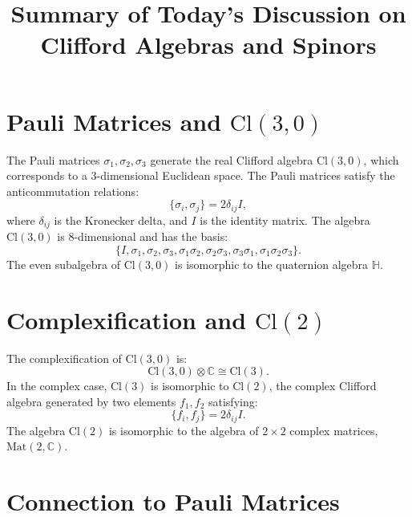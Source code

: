 \documentclass{article}
\begin{document}
\title{Summary of Today's Discussion on Clifford Algebras and Spinors}
\author{}
\date{}
\maketitle

\section*{Pauli Matrices and $\text{Cl}(3, 0)$}

The Pauli matrices $\sigma_1, \sigma_2, \sigma_3$ generate the real Clifford
algebra $\text{Cl}(3, 0)$, which corresponds to a 3-dimensional Euclidean
space. The Pauli matrices satisfy the anticommutation relations: 
\begin{equation*}
\{ \sigma_i, \sigma_j \} = 2 \delta_{ij} I, 
\end{equation*}
where $\delta_{ij}$ is the Kronecker delta, and $I$ is the identity matrix.
The algebra $\text{Cl}(3, 0)$ is 8-dimensional and has the basis: 
\begin{equation*}
\{ I, \sigma_1, \sigma_2, \sigma_3, \sigma_1 \sigma_2, \sigma_2 \sigma_3,
\sigma_3 \sigma_1, \sigma_1 \sigma_2 \sigma_3 \}. 
\end{equation*}
The even subalgebra of $\text{Cl}(3, 0)$ is isomorphic to the quaternion
algebra $\mathbb{H}$.

\section*{Complexification and $\text{Cl}(2)$}

The complexification of $\text{Cl}(3, 0)$ is: 
\begin{equation*}
\text{Cl}(3, 0) \otimes \mathbb{C} \cong \text{Cl}(3). 
\end{equation*}
In the complex case, $\text{Cl}(3)$ is isomorphic to $\text{Cl}(2)$, the
complex Clifford algebra generated by two elements $f_1, f_2$ satisfying: 
\begin{equation*}
\{ f_i, f_j \} = 2 \delta_{ij} I. 
\end{equation*}
The algebra $\text{Cl}(2)$ is isomorphic to the algebra of $2 \times 2$
complex matrices, $\text{Mat}(2, \mathbb{C})$.

\section*{Connection to Pauli Matrices}
\end{document}
